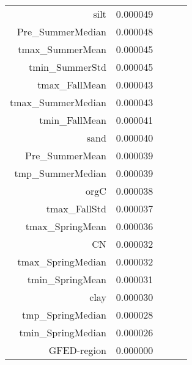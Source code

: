 \begin{tabular}{rrrrr}
silt & 0.000049 \\
Pre_SummerMedian & 0.000048 \\
tmax_SummerMean & 0.000045 \\
tmin_SummerStd & 0.000045 \\
tmax_FallMean & 0.000043 \\
tmax_SummerMedian & 0.000043 \\
tmin_FallMean & 0.000041 \\
sand & 0.000040 \\
Pre_SummerMean & 0.000039 \\
tmp_SummerMedian & 0.000039 \\
orgC & 0.000038 \\
tmax_FallStd & 0.000037 \\
tmax_SpringMean & 0.000036 \\
CN & 0.000032 \\
tmax_SpringMedian & 0.000032 \\
tmin_SpringMean & 0.000031 \\
clay & 0.000030 \\
tmp_SpringMedian & 0.000028 \\
tmin_SpringMedian & 0.000026 \\
GFED-region & 0.000000 \\
\bottomrule
\end{tabular}
